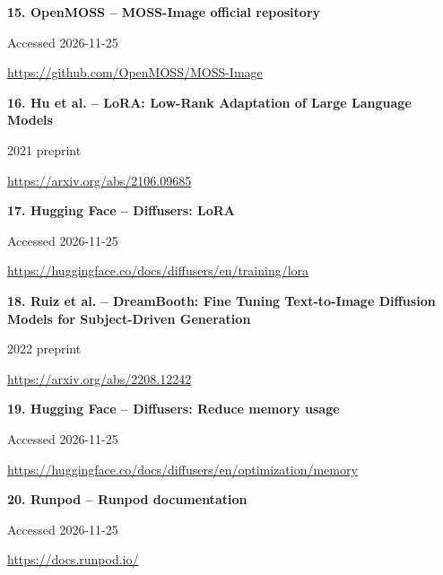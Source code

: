 \documentclass[11pt,a4paper]{article}
\begin{document}
\noindent\begin{minipage}{\linewidth}\textbf{15. OpenMOSS -- MOSS-Image official repository}\par{\small Accessed 2026-11-25\par\url{https://github.com/OpenMOSS/MOSS-Image}}\par
\end{minipage}\par\vspace{2mm}
\noindent\begin{minipage}{\linewidth}\textbf{16. Hu et al. -- LoRA: Low-Rank Adaptation of Large Language Models}\par{\small 2021 preprint\par\url{https://arxiv.org/abs/2106.09685}}\par
\end{minipage}\par\vspace{2mm}
\noindent\begin{minipage}{\linewidth}\textbf{17. Hugging Face -- Diffusers: LoRA}\par{\small Accessed 2026-11-25\par\url{https://huggingface.co/docs/diffusers/en/training/lora}}\par
\end{minipage}\par\vspace{2mm}
\noindent\begin{minipage}{\linewidth}\textbf{18. Ruiz et al. -- DreamBooth: Fine Tuning Text-to-Image Diffusion Models for Subject-Driven Generation}\par{\small 2022 preprint\par\url{https://arxiv.org/abs/2208.12242}}\par
\end{minipage}\par\vspace{2mm}
\noindent\begin{minipage}{\linewidth}\textbf{19. Hugging Face -- Diffusers: Reduce memory usage}\par{\small Accessed 2026-11-25\par\url{https://huggingface.co/docs/diffusers/en/optimization/memory}}\par
\end{minipage}\par\vspace{2mm}
\noindent\begin{minipage}{\linewidth}\textbf{20. Runpod -- Runpod documentation}\par{\small Accessed 2026-11-25\par\url{https://docs.runpod.io/}}\par
\end{minipage}\par\vspace{2mm}
\end{document}
